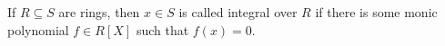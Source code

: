 If $R \subseteq S$ are rings, then $x \in S$ is called integral over $R$ if there
is some monic polynomial $f \in R[X]$ such that $f(x) = 0$.
